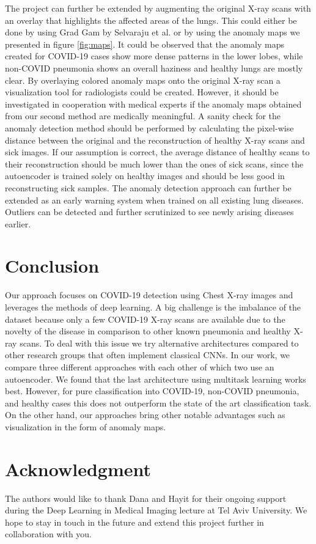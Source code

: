 \documentclass[conference]{IEEEtran}
\begin{document}
The project can further be extended by augmenting the original X-ray scans with an overlay that highlights the affected areas of the lungs. This could either be done by using Grad Gam by Selvaraju et al. \cite{selvaraju2017grad} or by using the anomaly maps we presented in figure \ref{fig:maps}. It could be observed that the anomaly maps created for COVID-19 cases show more dense patterns in the lower lobes, while non-COVID pneumonia shows an overall haziness and healthy lungs are mostly clear. By overlaying colored anomaly maps onto the original X-ray scan a visualization tool for radiologists could be created. However, it should be investigated in cooperation with medical experts if the anomaly maps obtained from our second method are medically meaningful.
A sanity check for the anomaly detection method should be performed by calculating the pixel-wise distance between the original and the reconstruction of healthy X-ray scans and sick images. If our assumption is correct, the average distance of healthy scans to their reconstruction should be much lower than the ones of sick scans, since the autoencoder is trained solely on healthy images and should be less good in reconstructing sick samples.
The anomaly detection approach can further be extended as an early warning system when trained on all existing lung diseases. Outliers can be detected and further scrutinized to see newly arising diseases earlier.

\label{chap6_conclusion}
\section{Conclusion}

Our approach focuses on COVID-19 detection using Chest X-ray images and leverages the methods of deep learning. A big challenge is the imbalance of the dataset because only a few COVID-19 X-ray scans are available due to the novelty of the disease in comparison to other known pneumonia and healthy X-ray scans. To deal with this issue we try alternative architectures compared to other research groups that often implement classical CNNs. 
In our work, we compare three different approaches with each other of which two use an autoencoder. We found that the last architecture using multitask learning works best. However, for pure classification into COVID-19, non-COVID pneumonia, and healthy cases this does not outperform the state of the art classification task. On the other hand, our approaches bring other notable advantages such as visualization in the form of anomaly maps.

\section*{Acknowledgment}
The authors would like to thank Dana and Hayit for their ongoing support during the Deep Learning in Medical Imaging lecture at Tel Aviv University. We hope to stay in touch in the future and extend this project further in collaboration with you.

\printbibliography
\end{document}
